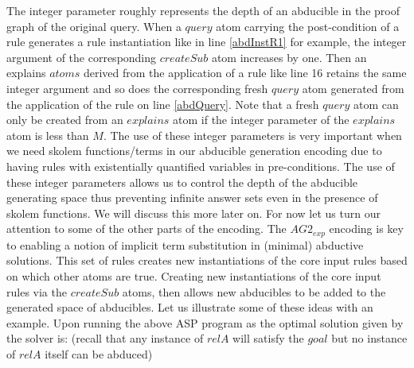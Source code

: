 \documentclass[sigconf]{acmart}
\begin{document}
The integer parameter roughly
represents the depth of an abducible in the proof graph of the original
query. When a $query$ atom carrying the post-condition of a rule generates a
rule instantiation like in line \ref{abdInstR1} for example, the integer argument of the
corresponding $createSub$ atom increases by one. Then an explains $atoms$
derived from the application of a rule like line 16 retains the same integer
argument and so does the corresponding fresh $query$ atom generated from the
application of the rule on line \ref{abdQuery}. Note that a fresh $query$ atom can only be
created from an $explains$ atom if the integer parameter of the $explains$
atom is less than $M$. The use of these integer parameters is very important
when we need skolem functions/terms in our abducible generation encoding due
to having rules with existentially quantified variables in pre-conditions. The
use of these integer parameters allows us to control the depth of the
abducible generating space thus preventing infinite answer sets even in the
presence of skolem functions. We will discuss this more later on. For now let
us turn our attention to some of the other parts of the encoding. The
$AG2_{exp}$ encoding is key to enabling a notion of implicit term substitution
in (minimal) abductive solutions. This set of rules creates new instantiations
of the core input rules based on which other atoms are true. Creating new
instantiations of the core input rules via the $createSub$ atoms, then allows
new abducibles to be added to the generated space of abducibles. Let us
illustrate some of these ideas with an example. Upon running the above ASP
program as the optimal solution given by the solver is: (recall that any
instance of $relA$ will satisfy the $goal$ but no instance of $relA$ itself
can be abduced) 
\end{document}
